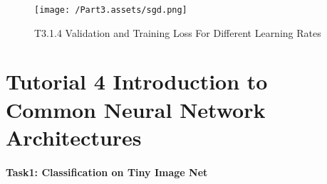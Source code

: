 \documentclass[10pt,twocolumn,letterpaper]{article}
\begin{document}
\begin{figure}[ht]
    \begin{center}
        \texttt{[image: /Part3.assets/sgd.png]}
        \caption{T3.1.4 Validation and Training Loss For Different Learning Rates}
        \vspace{-0.7cm}
        \label{fig:t34}
    \end{center}
\end{figure}


\section{Tutorial 4 Introduction to Common Neural Network Architectures}

\paragraph{Task1: Classification on Tiny Image Net}








\end{document}
